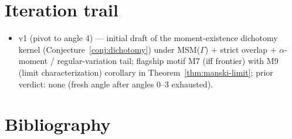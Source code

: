 \documentclass[11pt]{article}
\theoremstyle{definition}
\theoremstyle{plain}
\theoremstyle{remark}
\begin{document}
\section{Iteration trail}

\begin{itemize}[leftmargin=1.5em,itemsep=2pt]
\item v1 (pivot to angle 4) --- initial draft of the moment-existence dichotomy kernel (Conjecture~\ref{conj:dichotomy}) under MSM($\Gamma$) + strict overlap + $\alpha$-moment / regular-variation tail; flagship motif M7 (iff frontier) with M9 (limit characterization) corollary in Theorem~\ref{thm:manski-limit}; prior verdict: none (fresh angle after angles 0--3 exhausted).
\end{itemize}

\section*{Bibliography}
\end{document}
